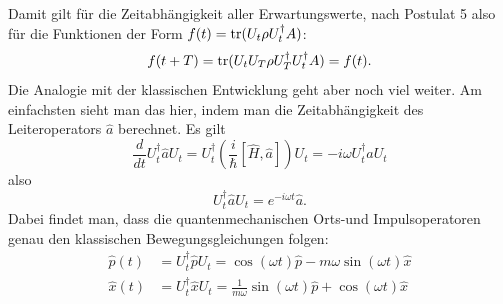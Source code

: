 Damit gilt für die Zeitabhängigkeit aller Erwartungswerte, nach Postulat 5 also für die Funktionen der Form $f(t) = \operatorname{tr}(U_t \rho U_t^\dag A)$:
\begin{equation}
	f(t+T) = \operatorname{tr}(U_tU_T \rho U_T^\dag U_t^\dag A) =f(t).
\end{equation}	
Die Analogie mit der klassischen Entwicklung geht aber noch viel weiter. Am einfachsten sieht man das hier, indem man die Zeitabhängigkeit des Leiteroperators $\widehat{a}$ berechnet. Es gilt 
\begin{equation}
	\frac{d}{dt} U_t^\dag \widehat{a} U_t = U_t^\dag \left(\frac{i}{\hbar} [\widehat{H},\widehat{a}] \right) U_t = -i\omega U_t^\dag \widehat{a} U_t
\end{equation}
also
\begin{equation}
	U_t^\dag \widehat{a} U_t = e^{-i\omega t}\widehat{a}.
\end{equation}
Dabei findet man, dass die quantenmechanischen Orts-und Impulsoperatoren genau den klassischen Bewegungsgleichungen folgen:
\begin{equation}
	\begin{split}
		\widehat{p}(t) &= U_t^\dag \widehat{p} U_t  = \cos(\omega t) \widehat{p}  - m\omega\sin(\omega t) \widehat{x} \\
		\widehat{x}(t) &= U_t^\dag \widehat{x} U_t  = \frac{1}{m\omega}\sin(\omega t) \widehat{p}  + \cos(\omega t) \widehat{x}
	\end{split}
\end{equation}
